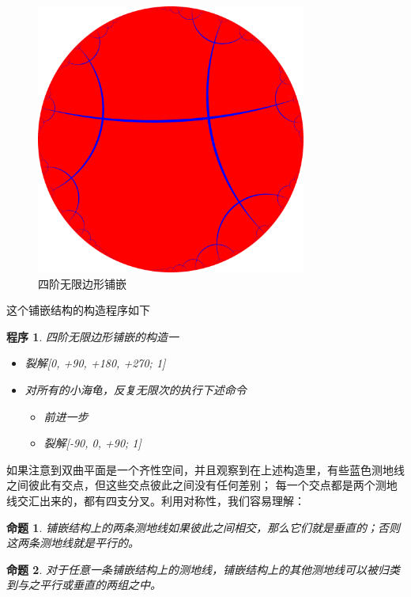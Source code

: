 \documentclass[a4paper,12pt]{article}
\newtheorem{proposition}{命题}
\newtheorem{program}{程序}
\begin{document}
\begin{figure}[ht]
\centering
\includegraphics[width=3.5in]{images/H2_tiling_24i-1.png}
\caption{四阶无限边形铺嵌}
\end{figure}

这个铺嵌结构的构造程序如下

\begin{program}
四阶无限边形铺嵌的构造一
\begin{itemize}
\item 裂解[0, +90, +180, +270; 1]
\item 对所有的小海龟，反复无限次的执行下述命令
\begin{itemize}\item 前进一步 \item 裂解[-90, 0, +90; 1] \end{itemize}
\end{itemize}
\end{program}

如果注意到双曲平面是一个齐性空间，并且观察到在上述构造里，有些蓝色测地线之间彼此有交点，但这些交点彼此之间没有任何差别；
每一个交点都是两个测地线交汇出来的，都有四支分叉。利用对称性，我们容易理解：

\begin{proposition}
\label{A}
铺嵌结构上的两条测地线如果彼此之间相交，那么它们就是垂直的；否则这两条测地线就是平行的。
\end{proposition}

\begin{proposition}
\label{B}
对于任意一条铺嵌结构上的测地线，铺嵌结构上的其他测地线可以被归类到与之平行或垂直的两组之中。
\end{proposition}

\newpage
\end{document}
